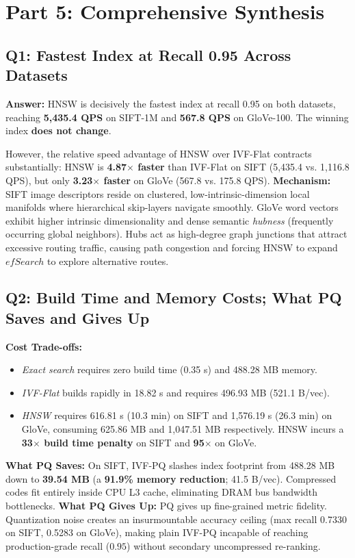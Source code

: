 \documentclass[11pt,a4paper]{article}
\begin{document}
\section{Part 5: Comprehensive Synthesis}

\subsection{Q1: Fastest Index at Recall 0.95 Across Datasets}
\textbf{Answer:} HNSW is decisively the fastest index at recall 0.95 on both datasets, reaching \textbf{5,435.4 QPS} on SIFT-1M and \textbf{567.8 QPS} on GloVe-100. The winning index \textbf{does not change}. 

However, the relative speed advantage of HNSW over IVF-Flat contracts substantially: HNSW is \textbf{4.87$\times$ faster} than IVF-Flat on SIFT (5,435.4 vs. 1,116.8 QPS), but only \textbf{3.23$\times$ faster} on GloVe (567.8 vs. 175.8 QPS).
\textbf{Mechanism:} SIFT image descriptors reside on clustered, low-intrinsic-dimension local manifolds where hierarchical skip-layers navigate smoothly. GloVe word vectors exhibit higher intrinsic dimensionality and dense semantic \textit{hubness} (frequently occurring global neighbors). Hubs act as high-degree graph junctions that attract excessive routing traffic, causing path congestion and forcing HNSW to expand $efSearch$ to explore alternative routes.

\subsection{Q2: Build Time and Memory Costs; What PQ Saves and Gives Up}
\textbf{Cost Trade-offs:} 
\begin{itemize}
    \item \textit{Exact search} requires zero build time (0.35 s) and 488.28 MB memory.
    \item \textit{IVF-Flat} builds rapidly in 18.82 s and requires 496.93 MB (521.1 B/vec).
    \item \textit{HNSW} requires 616.81 s (10.3 min) on SIFT and 1,576.19 s (26.3 min) on GloVe, consuming 625.86 MB and 1,047.51 MB respectively. HNSW incurs a \textbf{33$\times$ build time penalty} on SIFT and \textbf{95$\times$} on GloVe.
\end{itemize}
\textbf{What PQ Saves:} On SIFT, IVF-PQ slashes index footprint from 488.28 MB down to \textbf{39.54 MB} (a \textbf{91.9\% memory reduction}; 41.5 B/vec). Compressed codes fit entirely inside CPU L3 cache, eliminating DRAM bus bandwidth bottlenecks.
\textbf{What PQ Gives Up:} PQ gives up fine-grained metric fidelity. Quantization noise creates an insurmountable accuracy ceiling (max recall 0.7330 on SIFT, 0.5283 on GloVe), making plain IVF-PQ incapable of reaching production-grade recall ($0.95$) without secondary uncompressed re-ranking.
\end{document}
